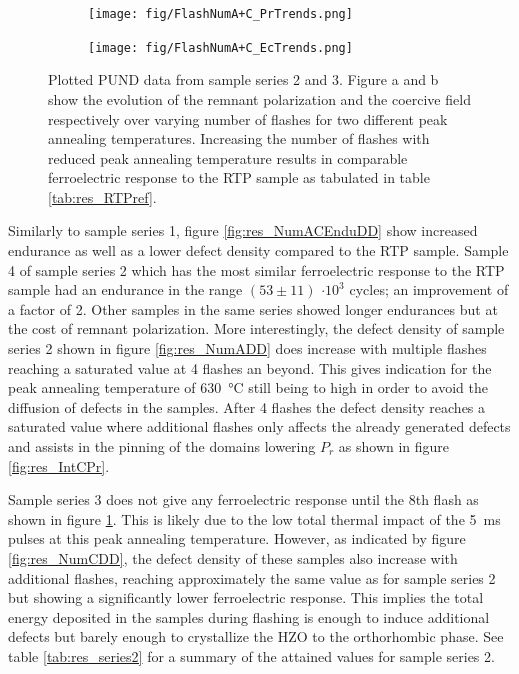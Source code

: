 \documentclass[11pt,twoside]{eitExjobb}
\begin{document}
\begin{figure}[htbp]
    \centering
    \begin{subfigure}{.4\linewidth}
        \texttt{[image: fig/FlashNumA+C\_PrTrends.png]}
        \caption{}\label{fig:res_NumACPr}
    \end{subfigure}
    \begin{subfigure}{.4\linewidth}
        \texttt{[image: fig/FlashNumA+C\_EcTrends.png]}
        \caption{}\label{fig:res_NumACEc}    
    \end{subfigure}
    \caption{Plotted PUND data from sample series 2 and 3. Figure a and b show the
    evolution of the remnant polarization and the coercive field respectively
    over varying number of flashes for two different peak annealing temperatures.
    Increasing the number of flashes with reduced peak annealing temperature
    results in comparable ferroelectric response to the RTP sample as tabulated
    in table \ref{tab:res_RTPref}.}\label{fig:res_NumACPUND}
\end{figure}

Similarly to sample series 1, figure \ref{fig:res_NumACEnduDD} show increased
endurance as well as a lower defect density compared to the RTP sample. Sample 4
of sample series 2 which has the most similar ferroelectric response to the RTP
sample had an endurance in the range $(53 \pm 11)$ $\cdot 10^3$ cycles; an
improvement of a factor of 2. Other samples in the same series showed longer
endurances but at the cost of remnant polarization. More interestingly, the
defect density of sample series 2 shown in figure \ref{fig:res_NumADD} does
increase with multiple flashes reaching a saturated value at 4 flashes an
beyond. This gives indication for the peak annealing temperature of
\SI{630}{\celsius} still being to high in order to avoid the diffusion of
defects in the samples. After 4 flashes the defect density reaches a saturated
value where additional flashes only affects the already generated defects and
assists in the pinning of the domains lowering $P_r$ as shown in figure
\ref{fig:res_IntCPr}.

Sample series 3 does not give any ferroelectric response until the 8th flash as
shown in figure \ref{fig:res_NumACPr}. This is likely due to the low total
thermal impact of the \SI{5}{\milli\second} pulses at this peak annealing
temperature. However, as indicated by figure \ref{fig:res_NumCDD}, the defect
density of these samples also increase with additional flashes, reaching
approximately the same value as for sample series 2 but showing a significantly
lower ferroelectric response. This implies the total energy deposited in the
samples during flashing is enough to induce additional defects but barely enough
to crystallize the HZO to the orthorhombic phase. See table
\ref{tab:res_series2} for a summary of the attained values for sample series 2.
\end{document}
